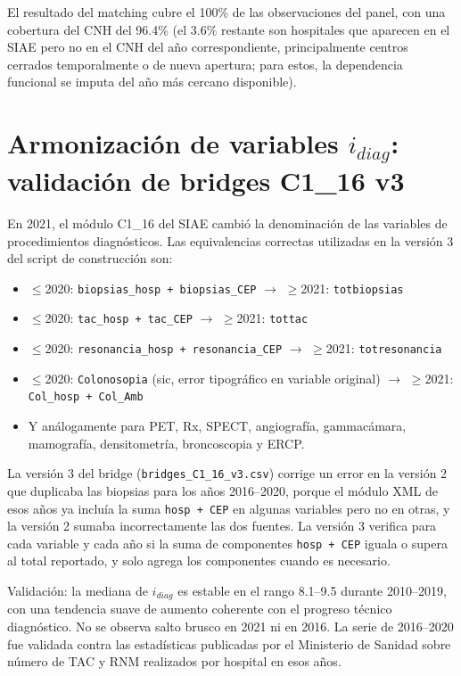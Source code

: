 \documentclass[12pt, a4paper, twoside, openright]{book}
\theoremstyle{plain}
\theoremstyle{definition}
\theoremstyle{remark}
\begin{document}
El resultado del matching cubre el 100\% de las observaciones del panel, con una cobertura del CNH del 96.4\% (el 3.6\% restante son hospitales que aparecen en el SIAE pero no en el CNH del año correspondiente, principalmente centros cerrados temporalmente o de nueva apertura; para estos, la dependencia funcional se imputa del año más cercano disponible).

\section{Armonización de variables \texorpdfstring{$i_{diag}$}{i\_diag}: validación de bridges C1\_16 v3}
\label{sec:bridges_v3}

En 2021, el módulo C1\_16 del SIAE cambió la denominación de las variables de procedimientos diagnósticos. Las equivalencias correctas utilizadas en la versión 3 del script de construcción son:
\begin{itemize}
  \item $\leq$2020: \texttt{biopsias\_hosp + biopsias\_CEP} $\rightarrow$ $\geq$2021: \texttt{totbiopsias}
  \item $\leq$2020: \texttt{tac\_hosp + tac\_CEP} $\rightarrow$ $\geq$2021: \texttt{tottac}
  \item $\leq$2020: \texttt{resonancia\_hosp + resonancia\_CEP} $\rightarrow$ $\geq$2021: \texttt{totresonancia}
  \item $\leq$2020: \texttt{Colonosopia} (sic, error tipográfico en variable original) $\rightarrow$ $\geq$2021: \texttt{Col\_hosp + Col\_Amb}
  \item Y análogamente para PET, Rx, SPECT, angiografía, gammacámara, mamografía, densitometría, broncoscopia y ERCP.
\end{itemize}

La versión 3 del bridge (\texttt{bridges\_C1\_16\_v3.csv}) corrige un error en la versión 2 que duplicaba las biopsias para los años 2016--2020, porque el módulo XML de esos años ya incluía la suma \texttt{hosp + CEP} en algunas variables pero no en otras, y la versión 2 sumaba incorrectamente las dos fuentes. La versión 3 verifica para cada variable y cada año si la suma de componentes \texttt{hosp + CEP} iguala o supera al total reportado, y solo agrega los componentes cuando es necesario.

Validación: la mediana de $i_{diag}$ es estable en el rango 8.1--9.5 durante 2010--2019, con una tendencia suave de aumento coherente con el progreso técnico diagnóstico. No se observa salto brusco en 2021 ni en 2016. La serie de 2016--2020 fue validada contra las estadísticas publicadas por el Ministerio de Sanidad sobre número de TAC y RNM realizados por hospital en esos años.
\end{document}
